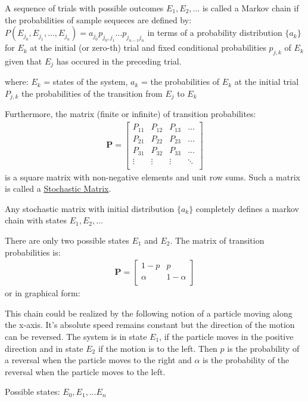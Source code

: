 
\begin{definition}
A sequence of trials with possible outcomes $E_1, E_2, \dots$ is called a Markov chain if the probabilities of sample sequeces are defined by: 
$ P(E_{j_0}, E_{j_1}, \dots , E_{j_n}) = a_{j_0}p_{j_0, j_1} \dots p_{j_{n-1} j_n}$ in terms of a probability distribution $\{a_k\}$ for $E_k$ at the initial (or zero-th) trial and fixed conditional probabilities $p_{j, k}$ of $E_k$ given that $E_j$ has occured in the preceding trial.
\end{definition}
where: $E_k$ = states of the system, $a_k$ = the probabilities of $E_k$ at the initial trial $P_{j, k}$ the probabilities of the transition from $E_j$ to $E_k$

Furthermore, the matrix (finite or infinite) of transition probabilites: 
\begin{align*}
    \mathbf{P} = \begin{bmatrix} 
                    P_{11} & P_{12} & P_{13} & \dots \\
                    P_{21} & P_{22} & P_{23} & \dots \\
                    P_{31} & P_{32} & P_{33} & \dots \\
                    \vdots & \vdots & \vdots & \ddots \\
                \end{bmatrix}
\end{align*}
is a square matrix with non-negative elements and unit row sums. Such a matrix is called a \underline{Stochastic Matrix}.

Any stochastic matrix with initial distribution $\{a_k\}$ completely defines a markov chain with states $E_1, E_2, \dots$

\begin{example}
There are only two possible states $E_1$ and $E_2$. The matrix of transition probabilities is: 
\begin{align}
    \mathbf{P} = \begin{bmatrix} 
                 1 - p & p \\
                 \alpha & 1 - \alpha \\
                 \end{bmatrix}
\end{align}
or in graphical form: 
\end{example}

\begin{remark}
This chain could be realized by the following notion of a particle moving along the x-axis. 
It's absolute speed remains constant but the direction of the motion can be reversed. 
The system is in state $E_1$, if the particle moves in the positive direction and in state $E_2$ if the motion is to the left.
Then $p$ is the probability of a reversal when the particle moves to the right and $\alpha$ is the probability of the reversal when the particle moves to the left.
\end{remark}

\begin{example}
Possible states: $E_0, E_1, \dots E_n$


\end{example}

